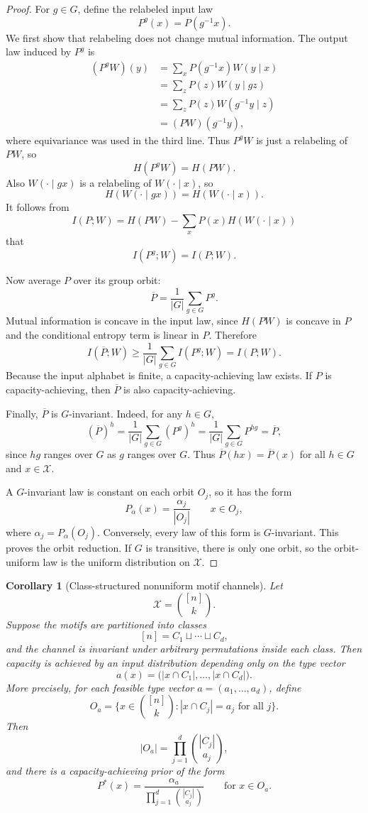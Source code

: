 \documentclass[11pt]{article}
\newtheorem{corollary}{Corollary}
\theoremstyle{definition}
\theoremstyle{remark}
\newcommand{\1}{\mathbf 1}
\begin{document}
\begin{proof}
For \(g\in G\), define the relabeled input law
\[
  P^g(x)=P(g^{-1}x).
\]
We first show that relabeling does not change mutual information.  The output law induced by \(P^g\) is
\[
\begin{aligned}
  (P^gW)(y)
  &=\sum_x P(g^{-1}x)W(y\mid x) \\
  &=\sum_z P(z)W(y\mid gz) \\
  &=\sum_z P(z)W(g^{-1}y\mid z) \\
  &=(PW)(g^{-1}y),
\end{aligned}
\]
where equivariance was used in the third line.  Thus \(P^gW\) is just a relabeling of \(PW\), so
\[
  H(P^gW)=H(PW).
\]
Also \(W(\cdot\mid gx)\) is a relabeling of \(W(\cdot\mid x)\), so
\[
  H(W(\cdot\mid gx))=H(W(\cdot\mid x)).
\]
It follows from
\[
  I(P;W)=H(PW)-\sum_x P(x)H(W(\cdot\mid x))
\]
that
\[
  I(P^g;W)=I(P;W).
\]

Now average \(P\) over its group orbit:
\[
  \overline P=\frac1{|G|}\sum_{g\in G}P^g.
\]
Mutual information is concave in the input law, since \(H(PW)\) is concave in \(P\) and the conditional entropy term is linear in \(P\).  Therefore
\[
  I(\overline P;W)
  \ge \frac1{|G|}\sum_{g\in G}I(P^g;W)
  =I(P;W).
\]
Because the input alphabet is finite, a capacity-achieving law exists.  If \(P\) is capacity-achieving, then \(\overline P\) is also capacity-achieving.

Finally, \(\overline P\) is \(G\)-invariant.  Indeed, for any \(h\in G\),
\[
  (\overline P)^h
  =\frac1{|G|}\sum_{g\in G}(P^g)^h
  =\frac1{|G|}\sum_{g\in G}P^{hg}
  =\overline P,
\]
since \(hg\) ranges over \(G\) as \(g\) ranges over \(G\).  Thus \(\overline P(hx)=\overline P(x)\) for all \(h\in G\) and \(x\in\mathcal X\).

A \(G\)-invariant law is constant on each orbit \(O_j\), so it has the form
\[
  P_\alpha(x)=\frac{\alpha_j}{|O_j|}\qquad x\in O_j,
\]
where \(\alpha_j=P_\alpha(O_j)\).  Conversely, every law of this form is \(G\)-invariant.  This proves the orbit reduction.  If \(G\) is transitive, there is only one orbit, so the orbit-uniform law is the uniform distribution on \(\mathcal X\).
\end{proof}

\begin{corollary}[Class-structured nonuniform motif channels]\label{cor:class-structured}
Let
\[
  \mathcal X=\binom{[n]}{k}.
\]
Suppose the motifs are partitioned into classes
\[
  [n]=C_1\sqcup\cdots\sqcup C_d,
\]
and the channel is invariant under arbitrary permutations inside each class.  Then capacity is achieved by an input distribution depending only on the type vector
\[
  a(x)=\bigl(|x\cap C_1|,\ldots,|x\cap C_d|\bigr).
\]
More precisely, for each feasible type vector \(a=(a_1,\ldots,a_d)\), define
\[
  O_a=\{x\in\binom{[n]}{k}: |x\cap C_j|=a_j\text{ for all }j\}.
\]
Then
\[
  |O_a|=\prod_{j=1}^d \binom{|C_j|}{a_j},
\]
and there is a capacity-achieving prior of the form
\[
  P^*(x)=
  \frac{\alpha_a}{\prod_{j=1}^d\binom{|C_j|}{a_j}}
  \qquad\text{for }x\in O_a.
\]
\end{corollary}
\end{document}
